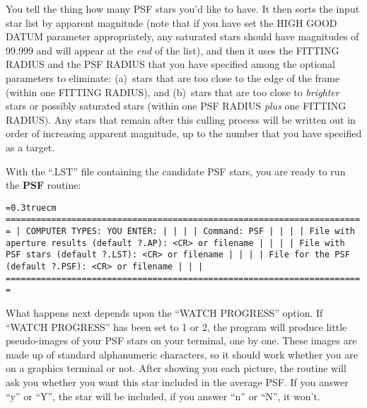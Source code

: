 You tell the thing how many PSF stars you'd like to have.  It then
sorts the input star list by apparent magnitude (note that if you have
set the HIGH GOOD DATUM parameter appropriately, any saturated stars
should have magnitudes of 99.999 and will appear at the {\it end\/} of
the list), and then it uses the FITTING RADIUS and the PSF RADIUS that
you have specified among the optional parameters to eliminate:
(a)~stars that are too close to the edge of the frame (within one
FITTING RADIUS), and (b)~stars that are too close to {\it brighter\/}
stars or possibly saturated stars (within one PSF RADIUS {\it plus\/}
one FITTING RADIUS).  Any stars that remain after this culling process
will be written out in order of increasing apparent magnitude, up to
the number that you have specified as a target.

With the ``.LST'' file containing the candidate PSF stars, you are
ready to run the {\bf PSF} routine:

\bigskip
{\noindent\obeylines\obeyspaces\frenchspacing\tt\baselineskip=0.3truecm
=======================================================================
| COMPUTER TYPES:                                  YOU ENTER:         |
|                                                                     |
| Command:                                         PSF                |
|                                                                     |
|  File with aperture results (default ?.AP):      <CR> or filename   |
|                                                                     |
|        File with PSF stars (default ?.LST):      <CR> or filename   |
|                                                                     |
|           File for the PSF (default ?.PSF):      <CR> or filename   |
|                                                                     |
=======================================================================
}
\bigskip

What happens next depends upon the ``WATCH PROGRESS'' option.  If
``WATCH PROGRESS'' has been set to 1 or 2, the program will produce
little pseudo-images of your PSF stars on your terminal, one by one.
These images are made up of standard alphanumeric characters, so it
should work whether you are on a graphics terminal or not.  After
showing you each picture, the routine will ask you whether you want
this star included in the average PSF.  If you answer ``y'' or ``Y'',
the star will be included, if you answer ``n'' or ``N'', it won't.

